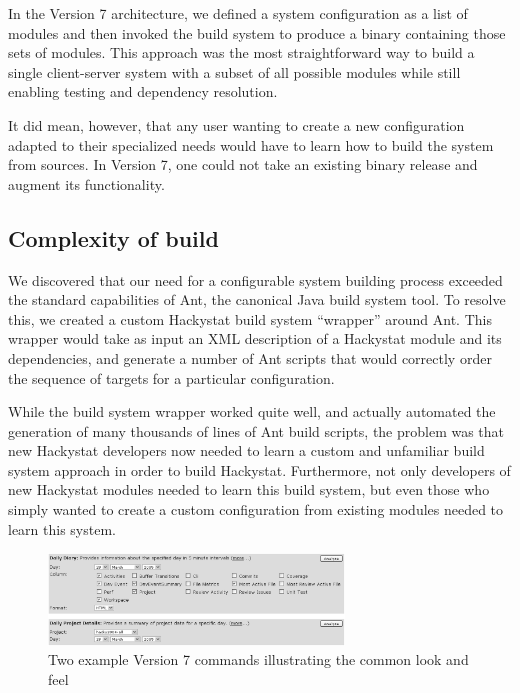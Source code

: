 \documentclass[conference,compsoc,peerreview]{IEEEtran}
\begin{document}
In the Version 7 architecture, we defined a system configuration as a list
of modules and then invoked the build system to produce a binary containing
those sets of modules.  This approach was the most straightforward way to 
build a single client-server system with a subset of all possible modules while 
still enabling testing and dependency resolution.

It did mean, however, that any user wanting to create a new configuration
adapted to their specialized needs would have to learn how to build the
system from sources. In Version 7, one could not take an existing binary
release and augment its functionality.  

\subsection{Complexity of build}

We discovered that our need for a configurable system building process
exceeded the standard capabilities of Ant, the canonical Java build system
tool.  To resolve this, we created a custom Hackystat build system
``wrapper'' around Ant.  This wrapper would take as input an XML
description of a Hackystat module and its dependencies, and generate a
number of Ant scripts that would correctly order the sequence of targets
for a particular configuration.

While the build system wrapper worked quite well, and actually automated
the generation of many thousands of lines of Ant build scripts, the problem
was that new Hackystat developers now needed to learn a custom and
unfamiliar build system approach in order to build Hackystat.  Furthermore,
not only developers of new Hackystat modules needed to learn this build
system, but even those who simply wanted to create a custom configuration
from existing modules needed to learn this system.

\begin{figure}[ht]
  \center
  \includegraphics[width=0.7\textwidth]{v7commands.eps}
  \caption{Two example Version 7 commands illustrating the common look and feel}
  \label{fig:commands}
\end{figure} 
\end{document}
